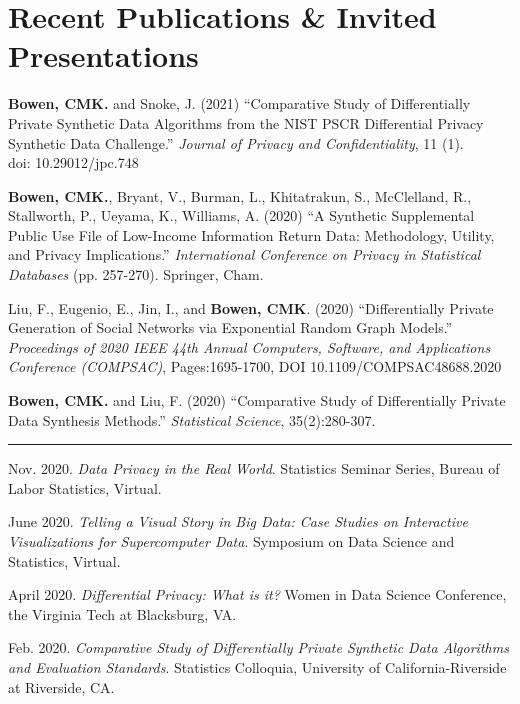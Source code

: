 \documentclass[11.5pt, letterpaper, roman]{moderncv} %
\begin{document}
\section{Recent Publications \& Invited Presentations}
\begin{etaremune}[topsep=0pt, itemsep=4pt, partopsep=0pt, parsep=0pt]

    \item \textbf{Bowen, CMK.} and Snoke, J. (2021) ``Comparative Study of Differentially Private Synthetic Data Algorithms from the NIST PSCR Differential Privacy Synthetic Data Challenge.'' \textit{Journal of Privacy and Confidentiality}, 11 (1).\\
    doi: 10.29012/jpc.748

    \item \textbf{Bowen, CMK.}, Bryant, V., Burman, L., Khitatrakun, S., McClelland, R., Stallworth, P., Ueyama, K., Williams, A. (2020) ``A Synthetic Supplemental Public Use File of Low-Income Information Return Data: Methodology, Utility, and Privacy Implications.'' \textit{International Conference on Privacy in Statistical Databases} (pp. 257-270). Springer, Cham.
    
    \item Liu, F., Eugenio, E., Jin, I., and \textbf{Bowen, CMK}. (2020) ``Differentially Private Generation of Social Networks via Exponential Random Graph Models.'' \textit{Proceedings of 2020 IEEE 44th Annual Computers, Software, and Applications Conference (COMPSAC)}, Pages:1695-1700, DOI 10.1109/COMPSAC48688.2020

    \item \textbf{Bowen, CMK.} and Liu, F. (2020) ``Comparative Study of Differentially Private Data Synthesis Methods.'' \textit{Statistical Science}, 35(2):280-307.

\end{etaremune}

\rule{\textwidth}{0.1pt}
\begin{etaremune}[topsep=0pt, itemsep=4pt, partopsep=0pt, parsep=0pt]
\smallskip
  \item Nov. 2020. \textit{Data Privacy in the Real World}. Statistics Seminar Series, Bureau of Labor Statistics, Virtual.
  
  \item June 2020. \textit{Telling a Visual Story in Big Data: Case Studies on Interactive Visualizations for Supercomputer Data}. Symposium on Data Science and Statistics, Virtual.
  
  \item April 2020. \textit{Differential Privacy: What is it?} Women in Data Science Conference, the Virginia Tech at Blacksburg, VA.
  
  \item Feb. 2020. \textit{Comparative Study of Differentially Private Synthetic Data Algorithms and Evaluation Standards}. Statistics Colloquia, University of California-Riverside at Riverside, CA.
  
\end{etaremune}
\end{document}
